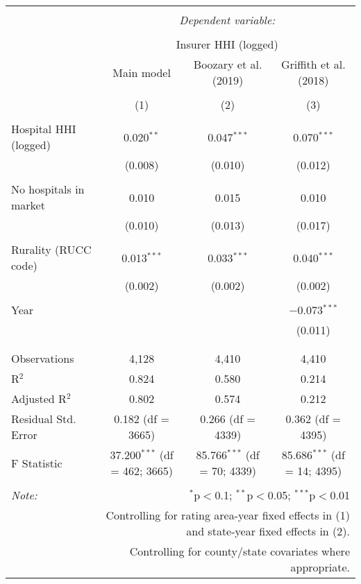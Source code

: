 
\begingroup 
\scriptsize 
\begin{tabular}{@{\extracolsep{5pt}}lccc} 
\\[-1.8ex]\hline 
\hline \\[-1.8ex] 
 & \multicolumn{3}{c}{\textit{Dependent variable:}} \\ 
\cline{2-4} 
\\[-1.8ex] & \multicolumn{3}{c}{Insurer HHI (logged)} \\ 
 & Main model & Boozary et al. (2019) & Griffith et al. (2018) \\ 
\\[-1.8ex] & (1) & (2) & (3)\\ 
\hline \\[-1.8ex] 
 Hospital HHI (logged) & 0.020$^{**}$ & 0.047$^{***}$ & 0.070$^{***}$ \\ 
  & (0.008) & (0.010) & (0.012) \\ 
  & & & \\ 
 No hospitals in market & 0.010 & 0.015 & 0.010 \\ 
  & (0.010) & (0.013) & (0.017) \\ 
  & & & \\ 
 Rurality (RUCC code) & 0.013$^{***}$ & 0.033$^{***}$ & 0.040$^{***}$ \\ 
  & (0.002) & (0.002) & (0.002) \\ 
  & & & \\ 
 Year &  &  & $-$0.073$^{***}$ \\ 
  &  &  & (0.011) \\ 
  & & & \\ 
\hline \\[-1.8ex] 
Observations & 4,128 & 4,410 & 4,410 \\ 
R$^{2}$ & 0.824 & 0.580 & 0.214 \\ 
Adjusted R$^{2}$ & 0.802 & 0.574 & 0.212 \\ 
Residual Std. Error & 0.182 (df = 3665) & 0.266 (df = 4339) & 0.362 (df = 4395) \\ 
F Statistic & 37.200$^{***}$ (df = 462; 3665) & 85.766$^{***}$ (df = 70; 4339) & 85.686$^{***}$ (df = 14; 4395) \\ 
\hline 
\hline \\[-1.8ex] 
\textit{Note:}  & \multicolumn{3}{r}{$^{*}$p$<$0.1; $^{**}$p$<$0.05; $^{***}$p$<$0.01} \\ 
 & \multicolumn{3}{r}{Controlling for rating area-year fixed effects in (1) and state-year fixed effects in (2).} \\ 
 & \multicolumn{3}{r}{Controlling for county/state covariates where appropriate.} \\ 
\end{tabular} 
\endgroup 
